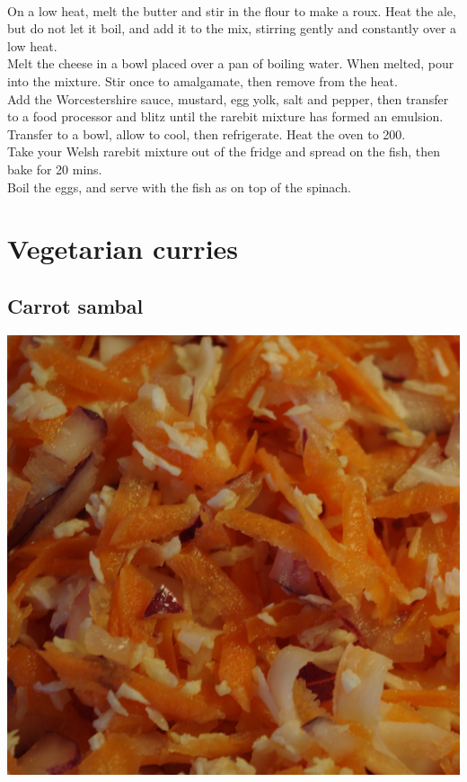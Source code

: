 \documentclass{tufte-book}
\begin{document}
\smallskip
{} 
\\On a low heat, melt the butter and stir in the flour to make a roux. Heat the ale, but do not let it boil, and add it to the mix, stirring gently and constantly over a low heat.
\\Melt the cheese in a bowl placed over a pan of boiling water. When melted, pour into the mixture. Stir once to amalgamate, then remove from the heat.
\\Add the Worcestershire sauce, mustard, egg yolk, salt and pepper, then transfer to a food processor and blitz until the rarebit mixture has formed an emulsion. Transfer to a bowl, allow to cool, then refrigerate.
Heat the oven to 200\celsius.
\\Take your Welsh rarebit mixture out of the fridge and spread on the fish, then bake for 20 mins.
\\Boil the eggs, and serve with the fish as on top of the spinach.

\chapter{Vegetarian curries}

\section{Carrot sambal}

\begin{marginfigure}%
  \includegraphics[width=\linewidth]{carrotraita.png}
\end{marginfigure}
\end{document}
